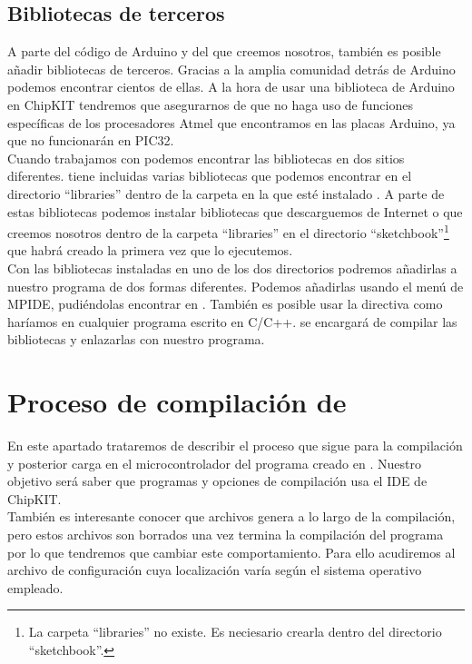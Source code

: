 \subsection{Bibliotecas de terceros}
A parte del código de Arduino y del que creemos nosotros, también es posible añadir bibliotecas de terceros. Gracias a la amplia comunidad detrás de Arduino podemos encontrar cientos de ellas. A la hora de usar una biblioteca de Arduino en ChipKIT tendremos que asegurarnos de que no haga uso de funciones específicas de los procesadores Atmel que encontramos en las placas Arduino, ya que no funcionarán en PIC32.\\
Cuando trabajamos con  podemos encontrar las bibliotecas en dos sitios diferentes.  tiene incluidas varias bibliotecas que podemos encontrar en el directorio ``libraries'' dentro de la carpeta en la que esté instalado . A parte de estas bibliotecas podemos instalar bibliotecas que descarguemos de Internet o que creemos nosotros dentro de la carpeta ``libraries'' en el directorio ``sketchbook''\protect\footnote{La carpeta ``libraries'' no existe. Es neciesario crearla dentro del directorio ``sketchbook''.} que  habrá creado la primera vez que lo ejecutemos.\\
Con las bibliotecas instaladas en uno de los dos directorios podremos añadirlas a nuestro programa de dos formas diferentes. Podemos añadirlas usando el menú de MPIDE, pudiéndolas encontrar en . También es posible usar la directiva  como haríamos en cualquier programa escrito en C/C++.  se encargará de compilar las bibliotecas y enlazarlas con nuestro programa.

\section{Proceso de compilación de }
En este apartado trataremos de describir el proceso que sigue  para la compilación y posterior carga en el microcontrolador del programa creado en . Nuestro objetivo será saber que programas y opciones de compilación usa el IDE de ChipKIT.\\
También es interesante conocer que archivos genera  a lo largo de la compilación, pero estos archivos son borrados una vez termina la compilación del programa por lo que tendremos que cambiar este comportamiento. Para ello acudiremos al archivo de configuración  cuya localización varía según el sistema operativo empleado.

